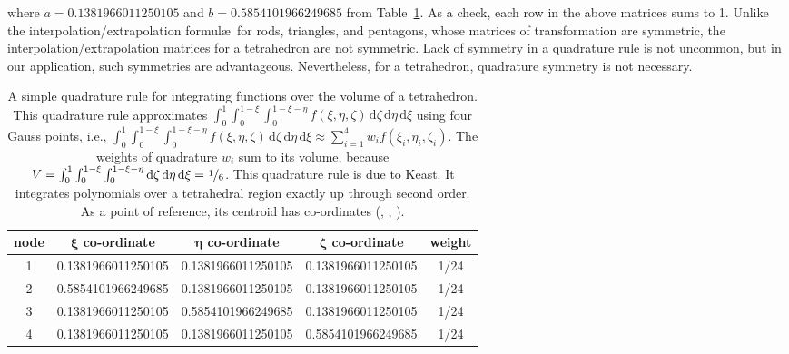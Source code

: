 where $a = 0.1381966011250105$ and $b = 0.5854101966249685$ from Table~\ref{tab:4nodedTet}.  As a check, each row in the above matrices sums to 1.  Unlike the interpolation\slash extrapolation formul\ae\ for rods, triangles, and pentagons, whose matrices of transformation are symmetric, the interpolation\slash extrapolation matrices for a tetrahedron are not symmetric.  Lack of symmetry in a quadrature rule is not uncommon, but in our application, such symmetries are advantageous.  Nevertheless, for a tetrahedron, quadrature symmetry is not necessary.
    
\begin{table}
\centering
\caption{A simple quadrature rule for integrating functions over the volume of a tetrahedron.  This quadrature rule approximates $\int_0^1 \int_0^{1-\xi} \int_0^{1-\xi-\eta} f(\xi, \eta, \zeta) \, \mathrm{d}\zeta \, \mathrm{d}\eta \, \mathrm{d}\xi$ using four Gauss points, i.e., $\int_0^1 \int_0^{1-\xi} \int_0^{1-\xi-\eta} f(\xi, \eta, \zeta) \, \mathrm{d}\zeta \, \mathrm{d}\eta \, \mathrm{d}\xi \approx \sum_{i=1}^4 w_i f( \xi_i , \eta_i , \zeta_i )$.  The weights of quadrature $w_i$ sum to its volume, because $V = \int_0^1 \int_0^{1-\xi} \int_0^{1-\xi-\eta} \mathrm{d}\zeta \, \mathrm{d}\eta \, \mathrm{d}\xi = \textfrac{1}{6}$.  This quadrature rule is due to Keast.  It integrates polynomials over a tetrahedral region exactly up through second order.  As a point of reference, its centroid has co-ordinates (, , ).}
\label{tab:4nodedTet}
    \footnotesize
    \begin{tabular}{ccccc}
        \hline
        \textbf{node} & $\boldsymbol{\xi}$ \textbf{co-ordinate} & 
        $\boldsymbol{\eta}$ \textbf{co-ordinate} & 
        $\boldsymbol{\zeta}$ \textbf{co-ordinate} & 
        \textbf{weight} \\ \hline        
        1 & 0.1381966011250105 & 0.1381966011250105 & 0.1381966011250105 & 1/24 \\
        2 & 0.5854101966249685 & 0.1381966011250105 & 0.1381966011250105 & 1/24 \\
        3 & 0.1381966011250105 & 0.5854101966249685 & 0.1381966011250105 & 1/24 \\
        4 & 0.1381966011250105 & 0.1381966011250105 & 0.5854101966249685 & 1/24 \\
        \hline
    \end{tabular}
    \normalsize
\end{table}



